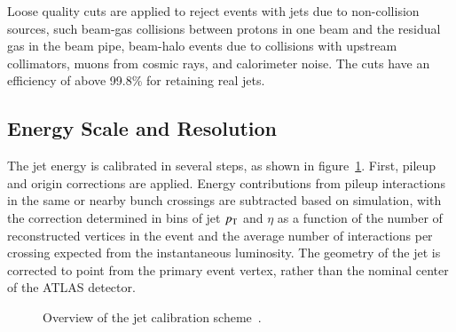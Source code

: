 Loose quality cuts are applied to reject events with jets due to non-collision sources, such beam-gas collisions between protons in one beam and the residual gas in the beam pipe, beam-halo events due to collisions with upstream collimators, muons from cosmic rays, and calorimeter noise. The cuts have an efficiency of above 99.8\% for retaining real jets. 


\subsection{Energy Scale and Resolution}\label{sec:reco-jets-energy-scale-resolution}
The jet energy is calibrated in several steps, as shown in figure~\ref{fig:reco-jet-calibration-flowchart}. First, pileup and origin corrections are applied. Energy contributions from pileup interactions in the same or nearby bunch crossings are subtracted based on simulation, with the correction determined in bins of jet $p_{\text{T}}$ and $\eta$ as a function of the number of reconstructed vertices in the event and the average number of interactions per crossing expected from the instantaneous luminosity. 
The geometry of the jet is corrected to point from the primary event vertex, rather than the nominal center of the ATLAS detector. 

\begin{figure}[htbp]
	\centering
	\caption[Overview of the jet calibration scheme.]{Overview of the jet calibration scheme~\cite{TheATLASCollaboration:2015ds}.}
	\label{fig:reco-jet-calibration-flowchart}
\end{figure}


